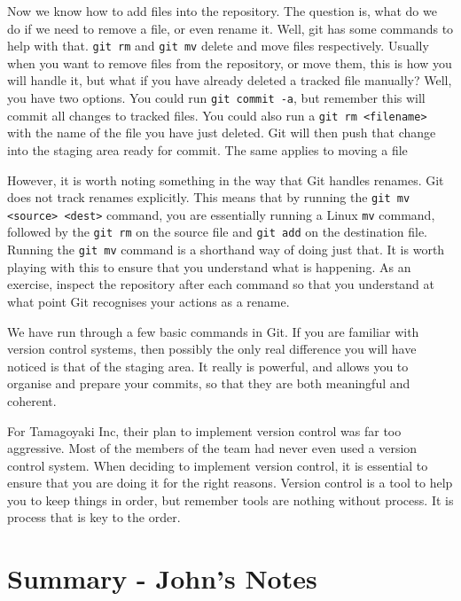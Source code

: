 Now we know how to add files into the repository.  The question is, what do we do if we need to remove a file, or even rename it.  Well, git has some commands to help with that.  \texttt{git rm} and \texttt{git mv} delete and move files respectively.  Usually when you want to remove files from the repository, or move them, this is how you will handle it, but what if you have already deleted a tracked file manually?  Well, you have two options.  You could run \texttt{git commit -a}, but remember this will commit all changes to tracked files.  You could also run a \texttt{git rm <filename>} with the name of the file you have just deleted.  Git will then push that change into the staging area ready for commit.  The same applies to moving a file

However, it is worth noting something in the way that Git handles renames.  Git does not track renames explicitly.  This means that by running the \texttt{git mv <source> <dest>} command, you are essentially running a Linux \texttt{mv} command, followed by the \texttt{git rm} on the source file and \texttt{git add} on the destination file.  Running the \texttt{git mv} command is a shorthand way of doing just that.  It is worth playing with this to ensure that you understand what is happening.  As an exercise, inspect the repository after each command so that you understand at what point Git recognises your actions as a rename.

We have run through a few basic commands in Git.  If you are familiar with version control systems, then possibly the only real difference you will have noticed is that of the staging area.  It really is powerful, and allows you to organise and prepare your commits, so that they are both meaningful and coherent.

For Tamagoyaki Inc, their plan to implement version control was far too aggressive.  Most of the members of the team had never even used a version control system.  When deciding to implement version control, it is essential to ensure that you are doing it for the right reasons.  Version control is a tool to help you to keep things in order, but remember tools are nothing without process.  It is process that is key to the order.


\clearpage
\section{Summary - John's Notes}
